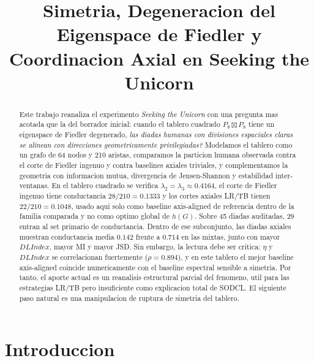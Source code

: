 \documentclass[conference]{IEEEtran}
\begin{document}
\title{Simetria, Degeneracion del Eigenspace de Fiedler y Coordinacion Axial en Seeking the Unicorn}

\author{
}

\maketitle

\begin{abstract}
Este trabajo reanaliza el experimento \emph{Seeking the Unicorn} \cite{andrade2021} con una pregunta mas acotada que la del borrador inicial: cuando el tablero cuadrado $P_8 \boxtimes P_8$ tiene un eigenspace de Fiedler degenerado, \textit{las diadas humanas con divisiones espaciales claras se alinean con direcciones geometricamente privilegiadas?} Modelamos el tablero como un grafo de 64 nodos y 210 aristas, comparamos la particion humana observada contra el corte de Fiedler ingenuo y contra baselines axiales triviales, y complementamos la geometria con informacion mutua, divergencia de Jensen-Shannon y estabilidad inter-ventanas. En el tablero cuadrado se verifica $\lambda_2=\lambda_3\approx0.4164$, el corte de Fiedler ingenuo tiene conductancia $28/210=0.1333$ y los cortes axiales LR/TB tienen $22/210=0.1048$, usado aqui solo como baseline axis-aligned de referencia dentro de la familia comparada y no como optimo global de $h(G)$. Sobre 45 diadas auditadas, 29 entran al set primario de conductancia. Dentro de ese subconjunto, las diadas axiales muestran conductancia media $0.142$ frente a $0.714$ en las mixtas, junto con mayor $DLIndex$, mayor MI y mayor JSD. Sin embargo, la lectura debe ser critica: $\eta$ y $DLIndex$ se correlacionan fuertemente ($\rho=0.894$), y en este tablero el mejor baseline axis-aligned coincide numericamente con el baseline espectral sensible a simetria. Por tanto, el aporte actual es un reanalisis estructural parcial del fenomeno, util para las estrategias LR/TB pero insuficiente como explicacion total de SODCL. El siguiente paso natural es una manipulacion de ruptura de simetria del tablero.
\end{abstract}

\section{Introduccion}
\end{document}
